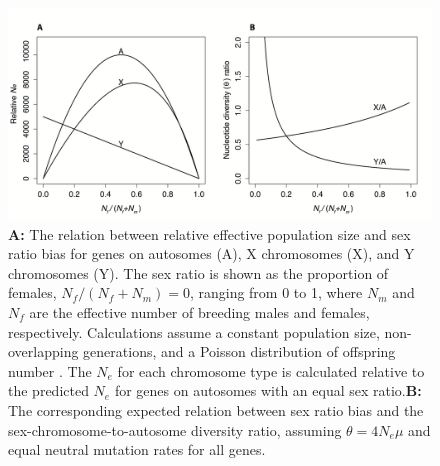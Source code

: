\documentclass[9pt,twocolumn,twoside]{gsajnl}
\begin{document}
\begin{figure}[htbp]
\centering
\includegraphics[width=\linewidth]{Figure1.png}
\caption{\textbf{A:} The relation between relative effective population size and sex ratio bias for genes on autosomes (A), X chromosomes (X), and Y chromosomes (Y). The sex ratio is shown as the proportion of females, $N_{f}/(N_{f}+N_{m})=0$, ranging from 0 to 1, where $N_{m}$ and $N_{f}$ are the effective number of breeding males and females, respectively. Calculations assume a constant population size, non-overlapping generations, and a Poisson distribution of offspring number \citep{wright1931evolution,charlesworth2009effective}. The $N_{e}$ for each chromosome type is calculated relative to the predicted $N_{e}$ for genes on autosomes with an equal sex ratio.\textbf{B:} The corresponding expected relation between sex ratio bias and the sex-chromosome-to-autosome diversity ratio, assuming $\theta=4N_{e}\mu$ and equal neutral mutation rates for all genes.
}%
\label{fig:spectrum}
\end{figure}
\end{document}
